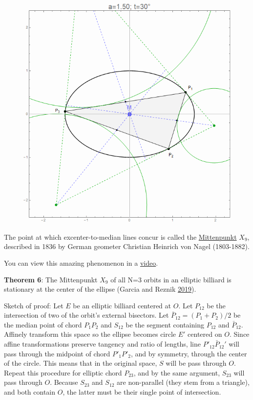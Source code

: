 \documentclass[]{article}
\begin{document}
\begin{figure}[H]

{\centering \includegraphics[width=0.5\linewidth]{pics/mittenpunkt30} 

}

\end{figure}

The point at which excenter-to-median lines concur is called the \href{https://en.wikipedia.org/wiki/Mittenpunkt}{Mittenpunkt} \(X_{9}\), described in 1836 by German geometer Christian Heinrich von Nagel (1803-1882).

You can view this amazing phenomenon in a \href{https://youtu.be/AoCWcza95OA}{video}.

\textbf{Theorem 6}: The Mittenpunkt \(X_{9}\) of all N=3 orbits in an elliptic billiard is stationary at the center of the ellipse (Garcia and Reznik \protect\hyperlink{ref-garcia19a}{2019}).

Sketch of proof: Let \(E\) be an elliptic billiard centered at \(O\). Let \(P_{12}\) be the intersection of two of the orbit's external bisectors. Let \(\bar{P}_{12}=(P_1+P_2)/2\) be the median point of chord \(P_1P_2\) and \(S_{12}\) be the segment containing \(P_{12}\) and \(\bar{P}_{12}\). Affinely transform this space so the ellipse becomes circle \(E'\) centered on \(O\). Since affine transformations preserve tangency and ratio of lengths, line \(P'_{12}\bar{P}_{12}'\) will pass through the midpoint of chord \(P'_1P'_2\), and by symmetry, through the center of the circle. This means that in the original space, \(S\) will be pass through \(O\). Repeat this procedure for elliptic chord \(P_{23}\), and by the same argument, \(S_{23}\) will pass through \(O\). Because \(S_{23}\) and \(S_{12}\) are non-parallel (they stem from a triangle), and both contain \(O\), the latter must be their single point of intersection.
\end{document}
